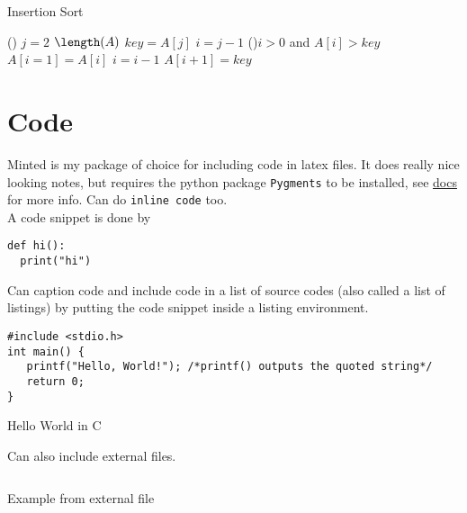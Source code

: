 \documentclass[11pt]{article}
\begin{document}
\begin{algorithm}[H]
    \caption{Insertion Sort}
    \label{alg:insertionsort}
    \DontPrintSemicolon
    \setlength{\commentWidth}{7cm}


    \For() {$j=2$ \KwTo $\length(A)$}{ 
        $key = A[j]$  \;
        $i=j-1$  \;
        \While(){$i>0$ and $A[i]>key$}{
            $A[i=1] = A[i]$  \;
            $i=i-1$  \;
        }
        $A[i+1] = key$  \;
    }
\end{algorithm}

\listofalgorithms


\section{Code}

Minted is my package of choice for including code in latex files. It does really nice looking notes, but requires the python package \texttt{Pygments} to be installed, see \href{https://mirror.aarnet.edu.au/pub/CTAN/macros/latex/contrib/minted/minted.pdf}{docs} for more info. Can do \texttt{inline code} too. \\


A code snippet is done by 
\begin{verbatim}
def hi():
  print("hi")
\end{verbatim}

Can caption code and include code in a list of source codes (also called a list of listings) by putting the code snippet inside a listing environment. 

\begin{listing}[!ht]
\begin{verbatim}
#include <stdio.h>
int main() {
   printf("Hello, World!"); /*printf() outputs the quoted string*/
   return 0;
}
\end{verbatim}
\caption{Hello World in C}
\label{listing:c}
\end{listing}



Can also include external files. 
\begin{listing}[!ht]
\inputminted{python}{resources/example.py}
\caption{Example from external file}
\label{listing:external}
\end{listing}
\end{document}
